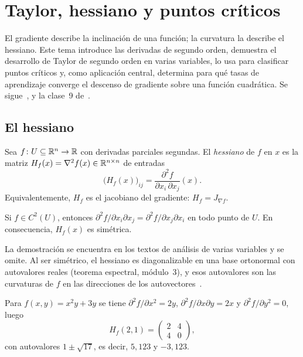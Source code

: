 \chapter{Taylor, hessiano y puntos críticos}
\label{tema:4}

El gradiente describe la inclinación de una función; la curvatura la describe el hessiano. Este tema introduce las derivadas de segundo orden, demuestra el desarrollo de Taylor de segundo orden en varias variables, lo usa para clasificar puntos críticos y, como aplicación central, determina para qué tasas de aprendizaje converge el descenso de gradiente sobre una función cuadrática. Se sigue~\cite[§5.7 y §5.8]{mml}, \cite[§4.2 y §4.3.1]{gbc} y la clase~9 de~\cite{mit1802}.

\section{El hessiano}

\begin{definicion}[Hessiano]\label{def:hessiano}
Sea $f\colon U\subseteq\mathbb{R}^{n}\to\mathbb{R}$ con derivadas parciales segundas. El \emph{hessiano} de $f$ en $x$ es la matriz $H_f(x)=\nabla^{2}f(x)\in\mathbb{R}^{n\times n}$ de entradas
\[
\bigl(H_f(x)\bigr)_{ij}=\frac{\partial^{2}f}{\partial x_i\,\partial x_j}(x).
\]
Equivalentemente, $H_f$ es el jacobiano del gradiente: $H_f=J_{\nabla f}$.
\end{definicion}

\begin{teorema}[Schwarz]\label{teo:schwarz}
Si $f\in C^{2}(U)$, entonces $\partial^{2}f/\partial x_i\partial x_j=\partial^{2}f/\partial x_j\partial x_i$ en todo punto de $U$. En consecuencia, $H_f(x)$ es simétrica.
\end{teorema}

La demostración se encuentra en los textos de análisis de varias variables y se omite. Al ser simétrico, el hessiano es diagonalizable en una base ortonormal con autovalores reales (teorema espectral, módulo~3), y esos autovalores son las curvaturas de $f$ en las direcciones de los autovectores~\cite[§4.3.1]{gbc}.

\begin{ejemplo}\label{ej:hessiano}
Para $f(x,y)=x^{2}y+3y$ se tiene $\partial^{2}f/\partial x^{2}=2y$, $\partial^{2}f/\partial x\partial y=2x$ y $\partial^{2}f/\partial y^{2}=0$, luego
\[
H_f(2,1)=\begin{pmatrix}2&4\\4&0\end{pmatrix},
\]
con autovalores $1\pm\sqrt{17}$, es decir, $5{,}123$ y $-3{,}123$.
\end{ejemplo}

